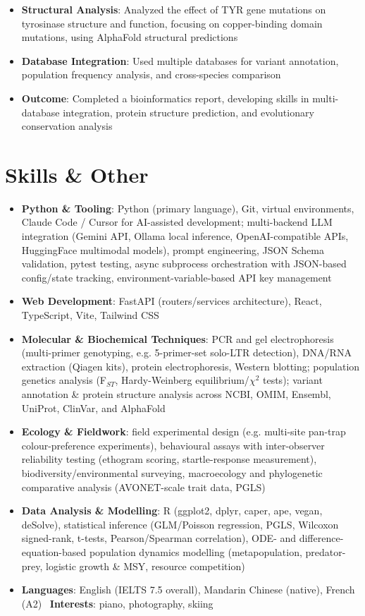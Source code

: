 \documentclass{my-resume}
\begin{document}
\begin{itemize}[parsep=0.2ex]
  \item \textbf{Structural Analysis}: Analyzed the effect of TYR gene mutations on tyrosinase structure and function, focusing on copper-binding domain mutations, using AlphaFold structural predictions
  \item \textbf{Database Integration}: Used multiple databases for variant annotation, population frequency analysis, and cross-species comparison
  \item \textbf{Outcome}: Completed a bioinformatics report, developing skills in multi-database integration, protein structure prediction, and evolutionary conservation analysis
\end{itemize}

\section{Skills \& Other}
\entrySkillsSep
\begin{itemize}[parsep=0.2ex]
  \item \textbf{Python \& Tooling}: Python (primary language), Git, virtual environments, Claude Code / Cursor for AI-assisted development; multi-backend LLM integration (Gemini API, Ollama local inference, OpenAI-compatible APIs, HuggingFace multimodal models), prompt engineering, JSON Schema validation, pytest testing, async subprocess orchestration with JSON-based config/state tracking, environment-variable-based API key management
  \item \textbf{Web Development}: FastAPI (routers/services architecture), React, TypeScript, Vite, Tailwind CSS
  \item \textbf{Molecular \& Biochemical Techniques}: PCR and gel electrophoresis (multi-primer genotyping, e.g. 5-primer-set solo-LTR detection), DNA/RNA extraction (Qiagen kits), protein electrophoresis, Western blotting; population genetics analysis (F$_{ST}$, Hardy-Weinberg equilibrium/$\chi^2$ tests); variant annotation \& protein structure analysis across NCBI, OMIM, Ensembl, UniProt, ClinVar, and AlphaFold
  \item \textbf{Ecology \& Fieldwork}: field experimental design (e.g. multi-site pan-trap colour-preference experiments), behavioural assays with inter-observer reliability testing (ethogram scoring, startle-response measurement), biodiversity/environmental surveying, macroecology and phylogenetic comparative analysis (AVONET-scale trait data, PGLS)
  \item \textbf{Data Analysis \& Modelling}: R (ggplot2, dplyr, caper, ape, vegan, deSolve), statistical inference (GLM/Poisson regression, PGLS, Wilcoxon signed-rank, t-tests, Pearson/Spearman correlation), ODE- and difference-equation-based population dynamics modelling (metapopulation, predator-prey, logistic growth \& MSY, resource competition)
  \item \textbf{Languages}: English (IELTS 7.5 overall), Mandarin Chinese (native), French (A2) \textbar\ \textbf{Interests}: piano, photography, skiing
\end{itemize}
\end{document}
